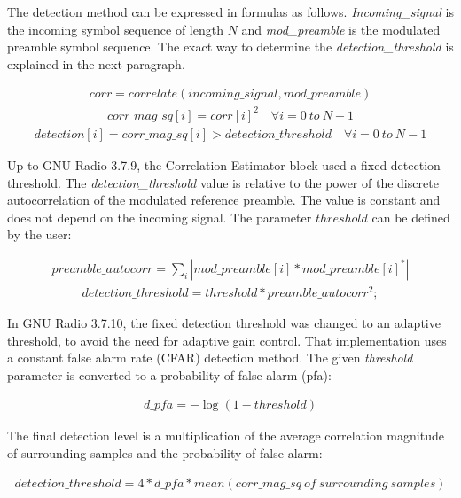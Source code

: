 The detection method can be expressed in formulas as follows. \textit{Incoming\_signal} is the incoming symbol sequence of length $N$ and \textit{mod\_preamble} is the modulated preamble symbol sequence. The exact way to determine the \textit{detection\_threshold} is explained in the next paragraph.  

\setlength{\abovedisplayskip}{1pt}
\setlength{\belowdisplayskip}{1pt}
\begin{align*}
 corr = correlate(incoming\_signal, mod\_preamble)
\end{align*}
\begin{align*}
 corr\_mag\_sq[i] = corr[i]^2 \quad \forall i = 0\ to\ N-1
\end{align*}
\begin{align*}
detection[i] = corr\_mag\_sq[i] > detection\_threshold \quad \forall  i = 0\ to\ N-1
\end{align*}
\smallskip

Up to GNU Radio 3.7.9, the Correlation Estimator block used a fixed detection threshold. The \textit{detection\_threshold} value is relative to the power of the discrete autocorrelation of the modulated reference preamble.  The value is constant and does not depend on the incoming signal. The parameter $threshold$ can be defined by the user:

\begin{align*}
preamble\_autocorr =  \sum_{i}{|mod\_preamble[i] * mod\_preamble[i]^*|}
\end{align*}
\begin{align*}
detection\_threshold = threshold * preamble\_autocorr^2;
\end{align*}
\smallskip




In GNU Radio 3.7.10, the fixed detection threshold was changed to an adaptive threshold, to avoid the need for adaptive gain control. That implementation uses a constant false alarm rate (CFAR) detection method. The given \textit{threshold} parameter is converted to a probability of false alarm (pfa):

\begin{align*}
 d\_pfa = -\log (1- threshold)
\end{align*}
\smallskip

The final detection level is a multiplication of the average correlation magnitude of surrounding samples and the probability of false alarm:

\begin{align*}
 detection\_threshold = 4 * d\_pfa * mean(corr\_mag\_sq\ of\ surrounding\ samples)
\end{align*}
\smallskip

